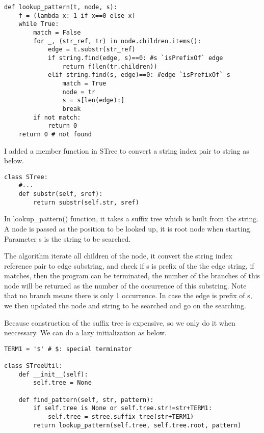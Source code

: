 \documentclass{article}
\begin{document}
\lstset{language=Python}
\begin{lstlisting}
def lookup_pattern(t, node, s):
    f = (lambda x: 1 if x==0 else x)
    while True:
        match = False
        for _, (str_ref, tr) in node.children.items():
            edge = t.substr(str_ref)
            if string.find(edge, s)==0: #s `isPrefixOf` edge
                return f(len(tr.children))
            elif string.find(s, edge)==0: #edge `isPrefixOf` s
                match = True
                node = tr
                s = s[len(edge):]
                break
        if not match:
            return 0
    return 0 # not found
\end{lstlisting}

I added a member function in STree to convert a string index
pair to string as below.

\begin{lstlisting}
class STree:
    #...
    def substr(self, sref):
        return substr(self.str, sref)
\end{lstlisting}

In lookup\_pattern() function, it takes a suffix tree which 
is built from the string.
A node is passed as the position to be looked up, it is root node when 
starting. Parameter s is the string to be searched.

The algorithm iterate all children of the node, it convert the string
index reference pair to edge substring, and check if s is prefix of the
the edge string, if matches, then the program can be terminated, the
number of the branches of this node will be returned as the number
of the occurrence of this substring. Note that no branch means there 
is only 1 occurrence. In case the edge is prefix of s, we then
updated the node and string to be searched and go on the searching.

Because construction of the suffix tree is expensive, so we only 
do it when neccessary. We can do a lazy initialization as below.

\begin{lstlisting}
TERM1 = '$' # $: special terminator

class STreeUtil:
    def __init__(self):
        self.tree = None

    def find_pattern(self, str, pattern):
        if self.tree is None or self.tree.str!=str+TERM1:
            self.tree = stree.suffix_tree(str+TERM1)
        return lookup_pattern(self.tree, self.tree.root, pattern)
\end{lstlisting}
\end{document}
